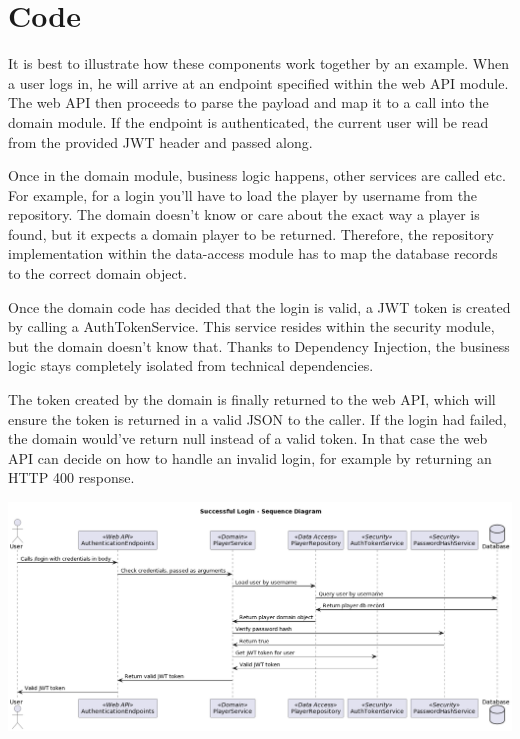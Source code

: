 \section{Code}
It is best to illustrate how these components work together by an example.
When a user logs in, he will arrive at an endpoint specified within the web API module.
The web API then proceeds to parse the payload and map it to a call into the domain module.
If the endpoint is authenticated, the current user will be read from the provided JWT header and passed along.

Once in the domain module, business logic happens, other services are called etc.
For example, for a login you'll have to load the player by username from the repository.
The domain doesn't know or care about the exact way a player is found, but it expects a domain player to be returned.
Therefore, the repository implementation within the data-access module has to map the database records to the correct domain object.

Once the domain code has decided that the login is valid, a JWT token is created by calling a AuthTokenService.
This service resides within the security module, but the domain doesn't know that.
Thanks to Dependency Injection, the business logic stays completely isolated from technical dependencies.

The token created by the domain is finally returned to the web API, which will ensure the token is returned in a valid JSON to the caller.
If the login had failed, the domain would've return null instead of a valid token.
In that case the web API can decide on how to handle an invalid login, for example by returning an HTTP 400 response.

\includegraphics[width=\textwidth]{resources/diagrams/login-sequence}

\newpage

